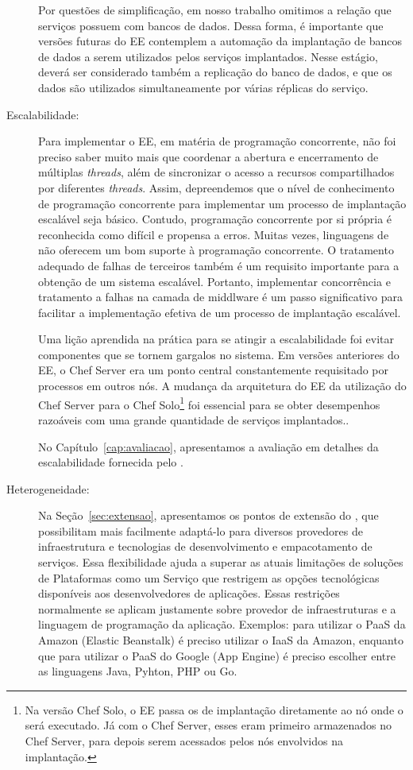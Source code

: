 \begin{description}
Por questões de simplificação, em nosso trabalho omitimos a relação que serviços possuem com bancos de dados.
Dessa forma, é importante que versões futuras do EE contemplem a automação da implantação de bancos de dados
a serem utilizados pelos serviços implantados. Nesse estágio, deverá ser considerado também a replicação
do banco de dados, e que os dados são utilizados simultaneamente por várias réplicas do serviço.

\item [Escalabilidade:]

Para implementar o EE, em matéria de programação concorrente, 
não foi preciso saber muito mais que coordenar a abertura e encerramento de múltiplas \emph{threads},
além de sincronizar o acesso a recursos compartilhados por diferentes \emph{threads}.
Assim, depreendemos que o nível de conhecimento de programação concorrente para implementar
um processo de implantação escalável seja básico.
Contudo, programação concorrente por si própria é reconhecida como difícil e propensa a erros. 
Muitas vezes, linguagens de \scripts não oferecem um bom suporte à programação concorrente.
O tratamento adequado de falhas de terceiros também é um requisito importante
para a obtenção de um sistema escalável.
Portanto, implementar concorrência e tratamento a falhas na camada de middlware
é um passo significativo para facilitar a implementação efetiva de um
processo de implantação escalável.

Uma lição aprendida na prática para se atingir a escalabilidade
foi evitar componentes que se tornem gargalos no sistema.
Em versões anteriores do EE, o Chef Server era um ponto central
constantemente requisitado por processos em outros nós.
A mudança da arquitetura do EE da utilização do Chef Server
para o Chef Solo\footnote{Na versão Chef Solo, o EE passa os \scripts de implantação
diretamente ao nó onde o \script será executado. Já com o Chef Server, esses \scripts eram
primeiro armazenados no Chef Server, para depois serem acessados 
pelos nós envolvidos na implantação.} 
foi essencial para se obter desempenhos razoáveis
com uma grande quantidade de serviços implantados..

No Capítulo~\ref{cap:avaliacao}, apresentamos a avaliação em detalhes da 
escalabilidade fornecida pelo \ee.

\item [Heterogeneidade:]

Na Seção~\ref{sec:extensao}, apresentamos os pontos de extensão do \ee,
que possibilitam mais facilmente adaptá-lo para diversos provedores de infraestrutura
e tecnologias de desenvolvimento e empacotamento de serviços.
Essa flexibilidade ajuda a superar
as atuais limitações de soluções de Plataformas como um Serviço
que restrigem as opções tecnológicas disponíveis aos desenvolvedores de aplicações.
Essas restrições normalmente se aplicam justamente sobre
provedor de infraestruturas e a linguagem de programação da aplicação.
Exemplos: para utilizar o PaaS da Amazon (Elastic Beanstalk) é preciso utilizar
o IaaS da Amazon, enquanto que para utilizar o PaaS do Google (App Engine)
é preciso escolher entre as linguagens Java, Pyhton, PHP ou Go.


\end{description}
